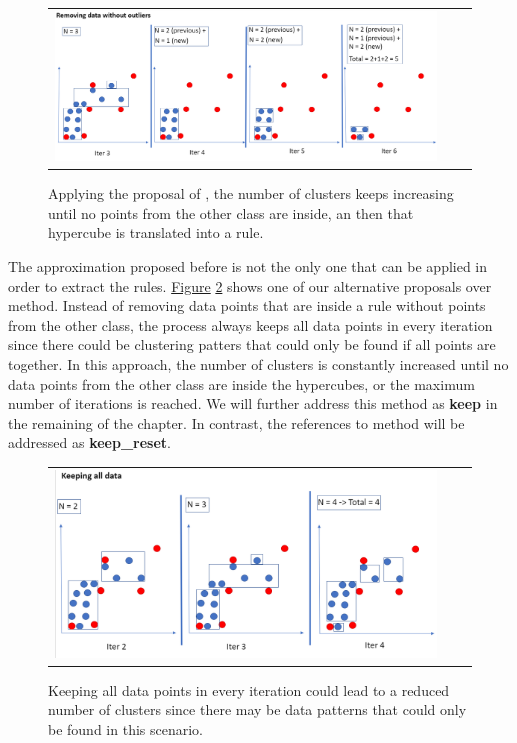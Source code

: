 \begin{figure}[!h]
\centering
  \begin{tabular}{c@{\qquad}c@{\qquad}c}
\includegraphics[width=0.8\columnwidth]{figures/chapter4_RuleExtraction/discard.png}
  \end{tabular} 
  \caption{Applying the proposal of \parencite{nunez2002rule}, the number of clusters keeps increasing until no points from the other class are inside, an then that hypercube is translated into a rule.\label{fig:ch4-discard}}
\end{figure}

The approximation proposed before is not the only one that can be applied in order to extract the rules. \hyperref[fig:ch4-keep]{Figure} \ref{fig:ch4-keep} shows one of our alternative proposals over \parencite{nunez2002rule} method. Instead of removing data points that are inside a rule without points from the other class, the process always keeps all data points in every iteration since there could be clustering patters that could only be found if all points are together. In this approach, the number of clusters is constantly increased until no data points from the other class are inside the hypercubes, or the maximum number of iterations is reached. We will further address this method as \textbf{keep} in the remaining of the chapter. In contrast, the references to \parencite{nunez2002rule} method will be addressed as \textbf{keep\_reset}.

\begin{figure}[!h]
\centering
  \begin{tabular}{c@{\qquad}c@{\qquad}c}
\includegraphics[width=0.75\columnwidth]{figures/chapter4_RuleExtraction/keep.png}
  \end{tabular} 
  \caption{Keeping all data points in every iteration could lead to a reduced number of clusters since there may be data patterns that could only be found in this scenario. \label{fig:ch4-keep}}
\end{figure}


